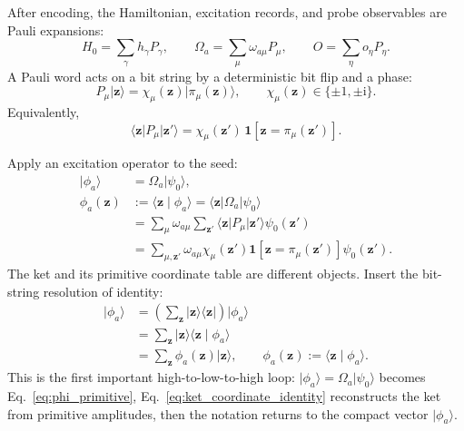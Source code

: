 \documentclass[10pt,twocolumn]{article}
\newcommand{\ii}{\mathrm i}
\newcommand{\ket}[1]{\lvert #1\rangle}
\newcommand{\bra}[1]{\langle #1\rvert}
\newcommand{\braket}[2]{\langle #1\mid #2\rangle}
\begin{document}
After encoding, the Hamiltonian, excitation records, and probe observables are Pauli expansions:
\begin{equation}
H_0=\sum_\gamma h_\gamma P_\gamma,
\qquad
\Omega_a=\sum_\mu \omega_{a\mu}P_\mu,
\qquad
O=\sum_\eta o_\eta P_\eta.
\label{eq:pauli_expansions}
\end{equation}
A Pauli word acts on a bit string by a deterministic bit flip and a phase:
\begin{equation}
P_\mu\ket{\mathbf z}
=\chi_\mu(\mathbf z)\ket{\pi_\mu(\mathbf z)},
\qquad
\chi_\mu(\mathbf z)\in\{\pm1,\pm\ii\}.
\label{eq:pauli_action}
\end{equation}
Equivalently,
\begin{equation}
\bra{\mathbf z}P_\mu\ket{\mathbf z'}
=\chi_\mu(\mathbf z')\,
\mathbf 1[\mathbf z=\pi_\mu(\mathbf z')].
\label{eq:pauli_matrix}
\end{equation}

Apply an excitation operator to the seed:
\begin{equation}
\begin{aligned}
\ket{\phi_a}
&=\Omega_a\ket{\psi_0},\\
\phi_a(\mathbf z)
&:=\braket{\mathbf z}{\phi_a}
=\bra{\mathbf z}\Omega_a\ket{\psi_0}\\
&=\sum_{\mu}\omega_{a\mu}
\sum_{\mathbf z'}
\bra{\mathbf z}P_\mu\ket{\mathbf z'}\psi_0(\mathbf z')\\
&=\sum_{\mu,\mathbf z'}
\omega_{a\mu}\chi_\mu(\mathbf z')
\mathbf 1[\mathbf z=\pi_\mu(\mathbf z')]\psi_0(\mathbf z').
\end{aligned}
\label{eq:phi_primitive}
\end{equation}
The ket and its primitive coordinate table are different objects. Insert the bit-string resolution of identity:
\begin{equation}
\begin{aligned}
\ket{\phi_a}
&=\left(\sum_{\mathbf z}\ket{\mathbf z}\bra{\mathbf z}\right)\ket{\phi_a}\\
&=\sum_{\mathbf z}\ket{\mathbf z}\braket{\mathbf z}{\phi_a}\\
&=\sum_{\mathbf z}\phi_a(\mathbf z)\ket{\mathbf z},
\qquad
\phi_a(\mathbf z):=\braket{\mathbf z}{\phi_a}.
\end{aligned}
\label{eq:ket_coordinate_identity}
\end{equation}
This is the first important high-to-low-to-high loop: \(\ket{\phi_a}=\Omega_a\ket{\psi_0}\) becomes Eq.~\eqref{eq:phi_primitive}, Eq.~\eqref{eq:ket_coordinate_identity} reconstructs the ket from primitive amplitudes, then the notation returns to the compact vector \(\ket{\phi_a}\).
\end{document}
